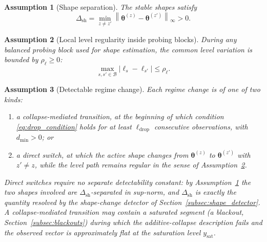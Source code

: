 \documentclass[11pt]{article}
\newtheorem{assumption}{Assumption}
\newcommand{\norm}[1]{\left\lVert #1 \right\rVert}
\newcommand{\abs}[1]{\left\lvert #1 \right\rvert}
\begin{document}
\begin{assumption}[Shape separation]
\label{ass:shape_separation}
The stable shapes satisfy
\begin{equation}
\label{eq:ass_shape_separation}
\Delta_{\mathrm{sh}}
=
\min_{z\neq z'}
\norm{\bm\theta^{(z)}-\bm\theta^{(z')}}_{\infty}
>0.
\end{equation}
\end{assumption}

\begin{assumption}[Local level regularity inside probing blocks]
\label{ass:level_regular}
During any balanced probing block used for shape estimation, the common level variation is bounded by $\rho_{\ell}\geq0$:
\begin{equation}
\label{eq:level_regular}
\max_{s,s'\in\mathcal B}
\abs{\ell_s-\ell_{s'}}
\leq
\rho_{\ell}.
\end{equation}
\end{assumption}

\begin{assumption}[Detectable regime change]
\label{ass:detectable_collapse}
Each regime change is of one of two kinds:
\begin{enumerate}
\item a \emph{collapse-mediated transition}, at the beginning of which condition \eqref{eq:drop_condition} holds for at least $\ell_{\mathrm{drop}}$ consecutive observations, with $d_{\min}>0$; or
\item a \emph{direct switch}, at which the active shape changes from $\bm\theta^{(z)}$ to $\bm\theta^{(z')}$ with $z'\neq z$, while the level path remains regular in the sense of Assumption~\ref{ass:level_regular}.
\end{enumerate}
Direct switches require no separate detectability constant: by Assumption~\ref{ass:shape_separation} the two shapes involved are $\Delta_{\mathrm{sh}}$-separated in sup-norm, and $\Delta_{\mathrm{sh}}$ is exactly the quantity resolved by the shape-change detector of Section~\ref{subsec:shape_detector}. A collapse-mediated transition may contain a \emph{saturated} segment (a blackout, Section~\ref{subsec:blackouts}) during which the additive-collapse description fails and the observed vector is approximately flat at the saturation level $y_{\mathrm{sat}}$.
\end{assumption}
\end{document}
